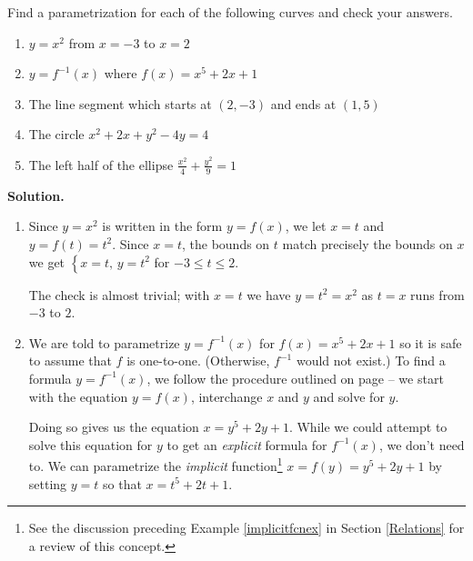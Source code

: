 \documentclass{ximera}
\begin{document}
\begin{example} \label{recttoparametric}  Find a parametrization for each of the following curves and check your answers.

\begin{enumerate}

\item $y = x^2$ from $x = -3$ to $x = 2$

\item  $y = f^{-1}(x)$ where $f(x) = x^5 + 2x + 1$

\item  The line segment which starts at $(2,-3)$ and ends at $(1,5)$

\item  The circle $x^2 + 2x + y^2 - 4y = 4$

\item  The left half of the ellipse $\frac{x^2}{4} + \frac{y^2}{9} = 1$

\end{enumerate}

{\bf Solution.} 

\begin{enumerate}

\item  Since $y = x^2$ is written in the form $y = f(x)$, we let $x = t$ and $y = f(t) = t^2$.  Since $x=t$, the bounds on $t$ match precisely the bounds on $x$  we get $\left\{ x = t, \, y = t^2 \right.$ for $-3 \leq t \leq 2$.  

\smallskip

The check is almost trivial; with $x=t$ we have $y = t^2 = x^2$ as $t = x$ runs from $-3$ to $2$.

\item  We are told to parametrize $y = f^{-1}(x)$ for $f(x) = x^5 + 2x + 1$ so it is safe to assume that $f$ is one-to-one.  (Otherwise, $f^{-1}$ would not exist.)  To find a formula $y = f^{-1}(x)$, we  follow the procedure outlined on page \pageref{inverseprocedure} -- we start with the equation $y = f(x)$, interchange $x$ and $y$ and solve for $y$.  

\smallskip

Doing so gives us the equation $x = y^5+2y+1$.  While we could attempt to solve this equation for $y$ to get an \textit{explicit} formula for $f^{-1}(x)$, we don't need to.  We can parametrize the \textit{implicit} function\footnote{See the discussion preceding Example \ref{implicitfcnex} in Section \ref{Relations} for a review of this concept.}  $x = f(y) = y^5+2y+1$ by setting $y = t$ so that $x = t^5 + 2t + 1$.  


\end{enumerate}
\end{example}
\end{document}
